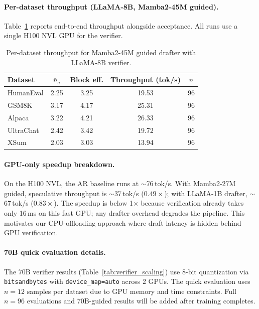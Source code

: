 \paragraph{Per-dataset throughput (LLaMA-8B, Mamba2-45M guided).}
Table~\ref{tab:app_throughput} reports end-to-end throughput alongside acceptance.
All runs use a single H100 NVL GPU for the verifier.

\begin{table}[h]
\centering
\caption{Per-dataset throughput for Mamba2-45M guided drafter with LLaMA-8B verifier.}
\label{tab:app_throughput}
\vspace{0.5em}
\begin{tabular}{@{}lcccc@{}}
\toprule
\textbf{Dataset} & $\bar{n}_a$ & \textbf{Block eff.} & \textbf{Throughput (tok/s)} & $n$ \\
\midrule
HumanEval  & 2.25 & 3.25 & 19.53 & 96 \\
GSM8K      & 3.17 & 4.17 & 25.31 & 96 \\
Alpaca     & 3.22 & 4.21 & 26.33 & 96 \\
UltraChat  & 2.42 & 3.42 & 19.72 & 96 \\
XSum       & 2.03 & 3.03 & 13.94 & 96 \\
\bottomrule
\end{tabular}
\end{table}

\paragraph{GPU-only speedup breakdown.}
On the H100 NVL, the AR baseline runs at $\sim$76\,tok/s.
With Mamba2-27M guided, speculative throughput is $\sim$37\,tok/s ($0.49\times$); with LLaMA-1B drafter, $\sim$67\,tok/s ($0.83\times$).
The speedup is below 1$\times$ because verification already takes only 16\,ms on this fast GPU; any drafter overhead degrades the pipeline.
This motivates our CPU-offloading approach where draft latency is hidden behind GPU verification.

\paragraph{70B quick evaluation details.}
The 70B verifier results (Table~\ref{tab:verifier_scaling}) use 8-bit quantization via \texttt{bitsandbytes} with \texttt{device\_map=auto} across 2 GPUs.
The quick evaluation uses $n\!=\!12$ samples per dataset due to GPU memory and time constraints.
Full $n\!=\!96$ evaluations and 70B-guided results will be added after training completes.
